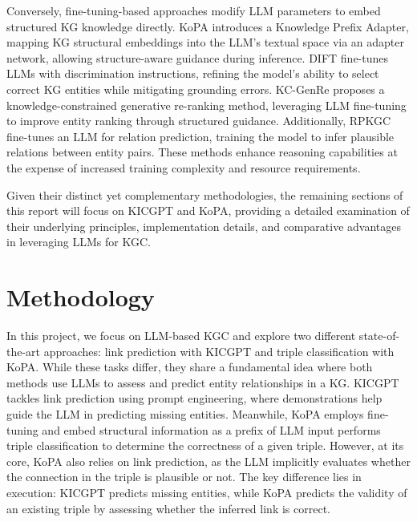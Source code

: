\documentclass[12pt,a4paper]{article}
\begin{document}
Conversely, fine-tuning-based approaches modify LLM parameters to embed structured KG knowledge directly. KoPA \cite{qin2023kopa} introduces a Knowledge Prefix Adapter, mapping KG structural embeddings into the LLM's textual space via an adapter network, allowing structure-aware guidance during inference. DIFT \cite{liu2024dift} fine-tunes LLMs with discrimination instructions, refining the model's ability to select correct KG entities while mitigating grounding errors. KC-GenRe \cite{wang2024kcgenre} proposes a knowledge-constrained generative re-ranking method, leveraging LLM fine-tuning to improve entity ranking through structured guidance. Additionally, RPKGC \cite{khalil2024rpkgc} fine-tunes an LLM for relation prediction, training the model to infer plausible relations between entity pairs. These methods enhance reasoning capabilities at the expense of increased training complexity and resource requirements.

Given their distinct yet complementary methodologies, the remaining sections of this report will focus on KICGPT and KoPA, providing a detailed examination of their underlying principles, implementation details, and comparative advantages in leveraging LLMs for KGC.

%
%

\section{Methodology}\label{sec:methodology}

In this project, we  focus on LLM-based KGC and explore two different
state-of-the-art approaches: link prediction with KICGPT
and triple classification with KoPA.
While these tasks differ, they share a fundamental idea where both
methods use LLMs to assess and predict entity relationships
in a KG. KICGPT tackles link prediction using prompt engineering,
where demonstrations help guide the LLM in predicting missing entities.
Meanwhile, KoPA employs fine-tuning and embed structural information
as a prefix of LLM input performs triple classification to determine the
correctness of a given triple. However, at its core, KoPA also relies
on link prediction, as the LLM implicitly evaluates whether the
connection in the triple is plausible or not. The key difference
lies in execution: KICGPT predicts missing entities, while KoPA
predicts the validity of an existing triple by assessing whether
the inferred link is correct.
\end{document}
